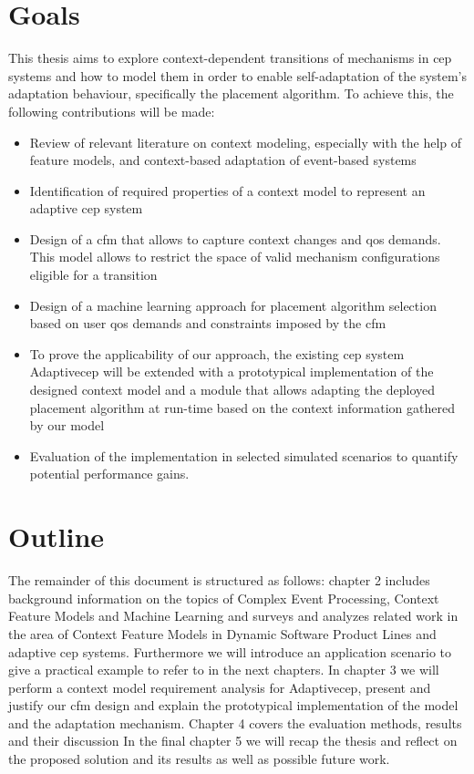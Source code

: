 \section{Goals}
This thesis aims to explore context-dependent transitions of mechanisms in \gls{cep} systems and how to model them in order to enable self-adaptation of the system's adaptation behaviour, specifically the placement algorithm. 
To achieve this, the following contributions will be made:
\begin{itemize}
\item Review of relevant literature on context modeling, especially with the help of feature models, and context-based adaptation of event-based systems
\item Identification of required properties of a context model to represent an adaptive \gls{cep} system
\item Design of a \gls{cfm} that allows to capture context changes and \gls{qos} demands. This model allows to restrict the space of valid mechanism configurations eligible for a transition
\item Design of a machine learning approach for placement algorithm selection based on user \gls{qos} demands and constraints imposed by the \gls{cfm}
\item To prove the applicability of our approach, the existing \gls{cep} system Adaptive\gls{cep} will be extended with a prototypical implementation of the designed context model and a module that allows adapting the deployed placement algorithm at run-time based on the context information gathered by our model
\item Evaluation of the implementation in selected simulated scenarios to quantify potential performance gains.
\end{itemize} 


\section{Outline}
The remainder of this document is structured as follows: 
chapter 2 includes background information on the topics of Complex Event Processing, Context Feature Models and Machine Learning and surveys and analyzes related work in the area of Context Feature Models in Dynamic Software Product Lines and adaptive \gls{cep} systems. Furthermore we will introduce an application scenario to give a practical example to refer to in the next chapters.
 In chapter 3 we will perform a context model requirement analysis for Adaptive\gls{cep}, present and justify our \gls{cfm} design and explain the prototypical implementation of the model and the adaptation mechanism.
 Chapter 4 covers the evaluation methods, results and their discussion
 In the final chapter 5 we will recap the thesis and reflect on the proposed solution and its results as well as possible future work.



